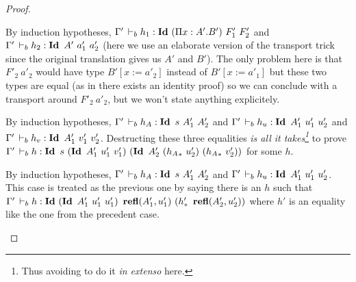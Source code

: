 \documentclass[a4paper,english]{lipics-utf8x}
\begin{document}
\begin{proof}
\begin{caselist}
      \begin{graycase}
        \begin{mathc}
        \end{mathc}
        By induction hypotheses,
        $\Gamma' \,\vdash_b h_1 : \operatorname{\mathbf{Id}~} (\Pi x:A'.B')\ F'_1\ F'_2$ and
        $\Gamma' \,\vdash_b h_2 : \operatorname{\mathbf{Id}~} A'\ a'_1\ a'_2$ (here we use an elaborate
        version of the transport trick since the original translation gives us
        $A'$ and $B'$).
        The only problem here is that $F'_2\ a'_2$ would have type
        $B'[x := a'_2]$ instead of $B'[x := a'_1]$ but these two types are equal
        (as in there exists an identity proof) so we can conclude with a
        transport around $F'_2\ a'_2$, but we won't state anything explicitely.
      \end{graycase}

      \begin{graycase}
        \begin{mathc}
        \end{mathc}
        By induction hypotheses, $\Gamma' \,\vdash_b h_A : \operatorname{\mathbf{Id}~} s\ A'_1\ A'_2$
        and $\Gamma' \,\vdash_b h_u : \operatorname{\mathbf{Id}~} A'_1\ u'_1\ u'_2$ and
        $\Gamma' \,\vdash_b h_v : \operatorname{\mathbf{Id}~} A'_1\ v'_1\ v'_2$.
        Destructing these three equalities \emph{is all it takes\footnote{Thus
        avoiding to do it \emph{in extenso} here.}} to prove
        $\Gamma' \derb h : \Id s\ (\Id A'_1\ u'_1\ v'_1)\ %
        (\Id A'_2\ ({h_A}_*\ u'_2)\ ({h_A}_*\ v'_2))$ for some $h$.
      \end{graycase}

      \begin{graycase}
        \begin{mathc}
        \end{mathc}
        By induction hypotheses, $\Gamma' \,\vdash_b h_A : \operatorname{\mathbf{Id}~} s\ A'_1\ A'_2$
        and $\Gamma' \,\vdash_b h_u : \operatorname{\mathbf{Id}~} A'_1\ u'_1\ u'_2$.
        This case is treated as the previous one by saying there is an $h$
        such that $\Gamma' \derb h : \Id (\Id A'_1\ u'_1\ u'_1)\ %
        \refl(A'_1,u'_1)\ (h'_*\ \refl(A'_2,u'_2))$ where $h'$ is an equality
        like the one from the precedent case.
      \end{graycase}


\end{caselist}
\end{proof}
\end{document}
